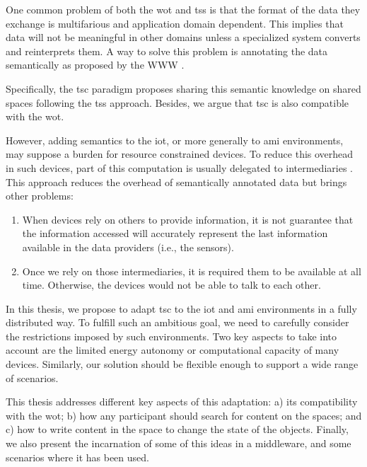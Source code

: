 \medskip

One common problem of both the \ac{wot} and \aclp{ts} is that the format of the data they exchange is multifarious and application domain dependent.
This implies that data will not be meaningful in other domains unless a specialized system converts and reinterprets them.
A way to solve this problem is annotating the data semantically as proposed by the WWW \cite{berners-lee_semantic_2001}.

Specifically, the \ac{tsc} paradigm \cite{fensel_triple-space_2004} proposes sharing this semantic knowledge on shared spaces following the \aclp{ts} approach.
Besides, we argue that \ac{tsc} is also compatible with the \ac{wot}.

However, adding semantics to the \ac{iot}, or more generally to \ac{ami} environments, may suppose a burden for resource constrained devices.
To reduce this overhead in such devices, part of this computation is usually delegated to intermediaries \cite{honkola_smart-m3_2010}. %
This approach reduces the overhead of semantically annotated data but brings other problems:
\begin{enumerate}
 \item When devices rely on others to provide information, it is not guarantee that the information accessed will accurately represent the last information available in the data providers (i.e., the sensors).
 \item Once we rely on those intermediaries, it is required them to be available at all time. Otherwise, the devices would not be able to talk to each other.
\end{enumerate}

In this thesis, we propose to adapt \ac{tsc} to the \ac{iot} and \ac{ami} environments in a fully distributed way.
To fulfill such an ambitious goal, we need to carefully consider the restrictions imposed by such environments.
Two key aspects to take into account are the limited energy autonomy or computational capacity of many devices.
Similarly, our solution should be flexible enough to support a wide range of scenarios.

This thesis addresses different key aspects of this adaptation:
a) its compatibility with the \ac{wot};
b) how any participant should search for content on the spaces;
and c) how to write content in the space to change the state of the objects.
Finally, we also present the incarnation of some of this ideas in a middleware,
and some scenarios where it has been used.
